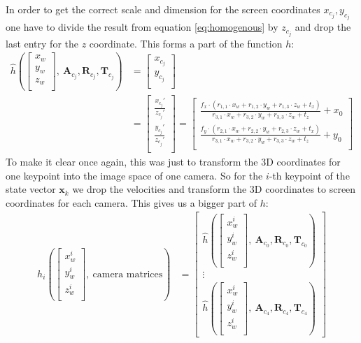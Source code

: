 In order to get the correct scale and dimension for the screen coordinates  $x_{c_j}, y_{c_j}$ one have to divide the result from equation \ref{eq:homogenous} by $z_{c_j}$ and drop the last entry for the $z$ coordinate. This forms a part of the function $h$:
\begin{align}\label{eq:screencoordinates}
\hat{h}(\begin{bmatrix}
x_w \\
y_w \\
z_w \\
\end{bmatrix},\  \mathbf{A}_{c_j}, \mathbf{R}_{c_j}, \mathbf{T}_{c_j}) &=
\begin{bmatrix}
	x_{c_j} \\
	y_{c_j} \\
\end{bmatrix} \\
&= 
\begin{bmatrix}
\frac{x_{c_j}'}{z_{c_j}'} \\
\frac{y_{c_j}'}{z_{c_j}'} \\
\end{bmatrix} = 
\begin{bmatrix}
\frac{f_x \cdot (r_{1,1} \cdot x_w + r_{1,2} \cdot y_w + r_{1,3} \cdot z_w + t_x)}{r_{3,1} \cdot x_w + r_{3,2} \cdot y_w + r_{3,3} \cdot z_w + t_z } + x_0 \\
\frac{f_y \cdot (r_{2,1} \cdot x_w + r_{2,2} \cdot y_w + r_{2,3} \cdot z_w + t_x)}{r_{3,1} \cdot x_w + r_{3,2} \cdot y_w + r_{3,3} \cdot z_w + t_z } + y_0 \\
\end{bmatrix}
\end{align}
To make it clear once again, this was just to transform the 3D coordinates for one keypoint into the image space of one camera. So for the $i$-th keypoint of the state vector $\mathbf{x}_k$ we drop the velocities and transform the 3D coordinates to screen coordinates for each camera. This gives us a bigger part of $h$:
\begin{align}
h_i(\begin{bmatrix}
x^i_w \\
y^i_w \\
z^i_w \\
\end{bmatrix},\ \text{camera matrices}) 
& = 
\begin{bmatrix}
\hat{h}(
\begin{bmatrix}
x^i_w \\
y^i_w \\
z^i_w \\
\end{bmatrix},\  \mathbf{A}_{c_0}, \mathbf{R}_{c_0}, \mathbf{T}_{c_0})\\
\vdots \\
\hat{h}(
\begin{bmatrix}
x^i_w \\
y^i_w \\
z^i_w \\
\end{bmatrix},\  \mathbf{A}_{c_4}, \mathbf{R}_{c_4}, \mathbf{T}_{c_4})
\end{bmatrix}
\end{align}
